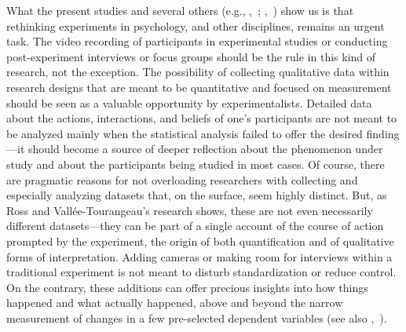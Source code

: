 \documentclass[twocolumn, issue, reflection, authordate]{jote-new-article}
\begin{document}
What the present studies and several others (e.g., ,~\citeyear{Glaveanu2019}; ,~\citeyear{Hawlina2019}) show us is that rethinking experiments in
psychology, and other disciplines, remains an urgent task. The video
recording of participants in experimental studies or conducting
post-experiment interviews or focus groups should be the rule in this
kind of research, not the exception. The possibility of collecting
qualitative data within research designs that are meant to be
quantitative and focused on measurement should be seen as a valuable
opportunity by experimentalists. Detailed data about the actions,
interactions, and beliefs of one's participants are not meant to be
analyzed mainly when the statistical analysis failed to offer the
desired finding---it should become a source of deeper reflection about
the phenomenon under study and about the participants being studied in
most cases. Of course, there are pragmatic reasons for not overloading
researchers with collecting and especially analyzing datasets that, on
the surface, seem highly distinct. But, as Ross and Vallée-Tourangeau's
research shows, these are not even necessarily different datasets---they
can be part of a single account of the course of action prompted by the
experiment, the origin of both quantification and of qualitative forms
of interpretation. Adding cameras or making room for interviews within a
traditional experiment is not meant to disturb standardization or reduce
control. On the contrary, these additions can offer precious insights
into how things happened and what actually happened, above and beyond
the narrow measurement of changes in a few pre-selected dependent
variables (see also ,~\citeyear{Glaveanu2019}).
\end{document}
